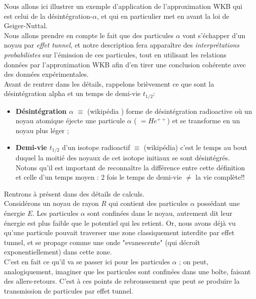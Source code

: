 \documentclass[12pt, a4paper]{book}
\begin{document}
Nous allons ici illustrer un exemple d'application de l'approximation WKB qui est celui de la désintégration-$\alpha$, et qui en particulier
met en avant la loi de Geiger-Nuttal. \\
Nous allons prendre en compte le fait que des particules $\alpha$ vont s'échapper d'un noyau par \textit{effet tunnel}, et notre description fera apparaître des \textit{interprétations probabilistes} sur l'émission de ces particules, 
tout en utilisant les relations données par l'approximation WKB afin d'en tirer une conclusion cohérente avec des données expérimentales. \\

Avant de rentrer dans les détails, rappelons brièvement ce que sont la désintégration alpha et un temps de demi-vie $t_{1/2}$: 
\begin{itemize}[label = \textbullet]
  \item \textbf{Désintégration $\alpha$} $\equiv$ (wikipédia {\color{red}{à vérifier}}) forme de désintégration radioactive où un noyau atomique éjecte une particule $\alpha$
  ( $= He^{++}$) et se transforme en un noyau plus léger ; 
  \item \textbf{Demi-vie $t_{1/2}$} d'un isotope radioactif $\equiv$ (wikipédia) c'est le temps au bout duquel la moitié des noyaux de cet isotope initiaux se sont désintégrés. \\
  Notons qu'il est important de reconnaître la différence entre cette définition et celle d'un temps moyen : 2 fois le temps de demi-vie $\ne$ la vie complète!!  
\end{itemize}

Rentrons à présent dans des détails de calculs. \\
Considérons un noyau de rayon $R$ qui contient des particules $\alpha$ possédant une énergie $E$. 
Les particules $\alpha$ sont confinées dans le noyau, autrement dit leur énergie est plus faible que le potentiel qui les retient.
Or, nous avons déjà vu qu'une particule pouvait traverser une zone classiquement interdite par effet tunnel, et se propage comme une onde "evanescente" (qui décroît exponentiellement) dans cette zone. \\
C'est en fait ce qu'il va se passer ici pour les particules $\alpha$ ; on peut, analogiquement, imaginer que les particules sont confinées dans une boîte, faisant des allers-retours. C'est à ces points de rebroussement que peut se produire la transmission de particules par effet tunnel. \\
\end{document}
